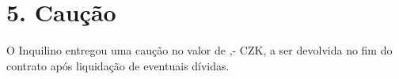 \section*{5. Caução}
O Inquilino entregou uma caução no valor de \DepositAmount,- CZK, a ser devolvida no fim do contrato após liquidação de eventuais dívidas.

